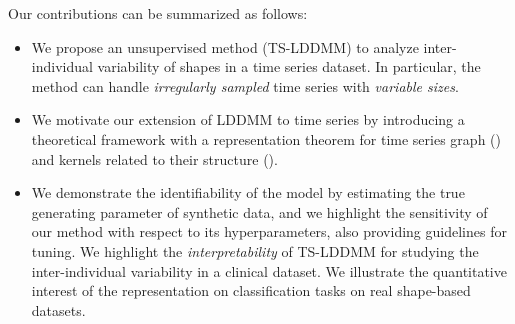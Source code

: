      Our contributions can be summarized as follows:
     \begin{itemize}
       \item We propose an unsupervised method (TS-LDDMM) to analyze inter-individual variability of shapes in a time series dataset. In particular, the method can handle \textit{irregularly sampled} time series with \textit{variable sizes}.
       \item We motivate our extension of LDDMM to time series by introducing a theoretical framework with a representation theorem for time series graph () and kernels related to their structure ().
       \item We demonstrate the identifiability of the model by estimating the true generating parameter of synthetic data, and we highlight the sensitivity of our method with respect to its hyperparameters, also providing guidelines for tuning.
       We highlight the \textit{interpretability} of TS-LDDMM for studying the inter-individual variability in a clinical dataset.
        We illustrate the quantitative interest of the representation on classification tasks on real shape-based datasets.
        
     \end{itemize}


      
